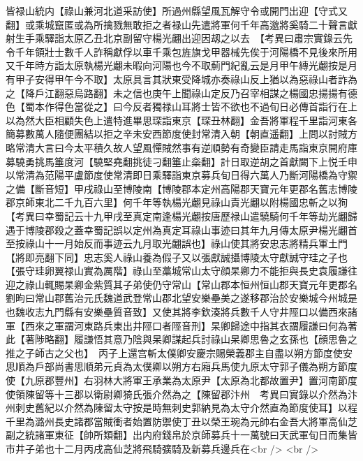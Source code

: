 皆禄山統内【祿山兼河北道采訪使】所過州縣望風瓦解守令或開門出迎【守式又翻】或乘城竄匿或為所擒戮無敢拒之者禄山先遣將軍何千年高邈將奚騎二十聲言獻射生手乘驛詣太原乙丑北京副留守楊光翽出迎因刼之以去　【考異曰肅宗實錄云先令千年領壯士數千人詐稱獻俘以車千乘包旌旗戈甲器械先俟于河陽橋不見後來所用又千年時方詣太原執楊光翽未暇向河陽也今不取薊門紀亂云是月甲午縳光翽按是月有甲子安得甲午今不取】太原具言其狀東受降城亦奏祿山反上猶以為惡祿山者詐為之【降戶江翻惡烏路翻】未之信也庚午上聞祿山定反乃召宰相謀之楊國忠揚揚有德色【蜀本作得色當從之】曰今反者獨禄山耳將士皆不欲也不過旬日必傳首詣行在上以為然大臣相顧失色上遣特進畢思琛詣東京【琛丑林翻】金吾將軍程千里詣河東各簡募數萬人隨便團結以拒之辛未安西節度使封常清入朝【朝直遥翻】上問以討賊方略常清大言曰今太平積久故人望風憚賊然事有逆順勢有奇變臣請走馬詣東京開府庫募驍勇挑馬箠度河【驍堅堯翻挑徒刁翻箠止橤翻】計日取逆胡之首獻闕下上悦壬申以常清為范陽平盧節度使常清即日乘驛詣東京募兵旬日得六萬人乃斷河陽橋為守禦之備【斷音短】甲戌祿山至博陵南【博陵郡本定州高陽郡天寶元年更郡名舊志博陵郡京師東北二千九百六里】何千年等執楊光翽見祿山責光翽以附楊國忠斬之以狥　【考異曰幸蜀記云十九甲戌至真定南逢楊光翽按唐歷禄山遣驍騎何千年等劫光翽歸遇于博陵郡殺之蓋幸蜀記誤以定州為真定耳祿山事迹曰其年九月傳太原尹楊光翽首至按祿山十一月始反而事迹云九月取光翽誤也】祿山使其將安忠志將精兵軍土門【將即亮翻下同】忠志奚人祿山養為假子又以張獻誠攝博陵太守獻誠守珪之子也【張守珪卵翼禄山實為厲階】祿山至藁城常山太守顔杲卿力不能拒與長史袁履謙往迎之祿山輒賜杲卿金紫質其子弟使仍守常山【常山郡本恒州恒山郡天寶元年更郡名劉昫曰常山郡舊治元氏魏道武登常山郡北望安樂壘美之遂移郡治於安樂城今州城是也魏收志九門縣有安樂壘質音致】又使其將李欽湊將兵數千人守井陘口以備西來諸軍【西來之軍謂河東路兵東出井陘口者陘音刑】杲卿歸途中指其衣謂履謙曰何為著此【著陟略翻】履謙悟其意乃陰與杲卿謀起兵討祿山杲卿思魯之玄孫也【顔思魯之推之子師古之父也】　丙子上還宫斬太僕卿安慶宗賜榮義郡主自盡以朔方節度使安思順為戶部尚書思順弟元貞為太僕卿以朔方右廂兵馬使九原太守郭子儀為朔方節度使【九原郡豐州】右羽林大將軍王承業為太原尹【太原為北都故置尹】置河南節度使領陳留等十三郡以衛尉卿猗氏張介然為之【陳留郡汴州　考異曰實錄以介然為汴州刺史舊紀以介然為陳留太守按是時無刺史郭納見為太守介然直為節度使耳】以程千里為潞州長史諸郡當賊衝者始置防禦使丁丑以榮王琬為元帥右金吾大將軍高仙芝副之統諸軍東征【帥所類翻】出内府錢帛於京師募兵十一萬號曰天武軍旬日而集皆市井子弟也十二月丙戌高仙芝將飛騎彍騎及新募兵邊兵在<br />
<br />
